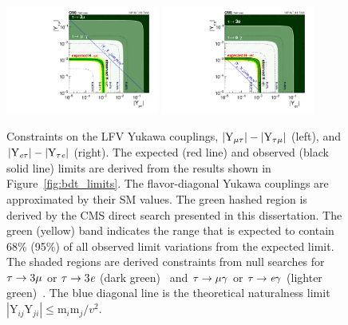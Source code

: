 \begin{figure}[htbp!]
  \centering
  \includegraphics[width=0.45\textwidth]{plots/chapter9/limits/Ymt.pdf}
  \includegraphics[width=0.45\textwidth]{plots/chapter9/limits/Yet.pdf} \\
  \caption{Constraints on the LFV Yukawa couplings, $|\text{Y}_{\mu\tau}|-|\text{Y}_{\tau\mu}|$ (left), and $|\text{Y}_{\textit{e}\tau}|-|\text{Y}_{\tau\textit{e}}|$ (right). The expected (red line) and observed (black solid line) limits are derived from the results shown in Figure~\ref{fig:bdt_limits}. The flavor-diagonal Yukawa couplings are approximated by their SM values. The green hashed region is derived by the CMS direct search presented in this dissertation. The green (yellow) band indicates the range that is expected to contain 68\% (95\%) of all observed limit variations from the expected limit. The shaded regions are derived constraints from null searches for $\tau\to3\mu$ or $\tau\to3\textit{e}$ (dark green)~\cite{Hayasaka:2010np} and $\tau\to\mu\gamma$ or $\tau\to\textit{e}\gamma$ (lighter green)~\cite{Harnik:2012pb}. The blue diagonal line is the theoretical naturalness limit $|\text{Y}_{ij}\text{Y}_{ji}|\leq{\text{m}_i}\text{m}_j/v^2$.}
  \label{fig:bdt_yukawa_limits}
\end{figure}






